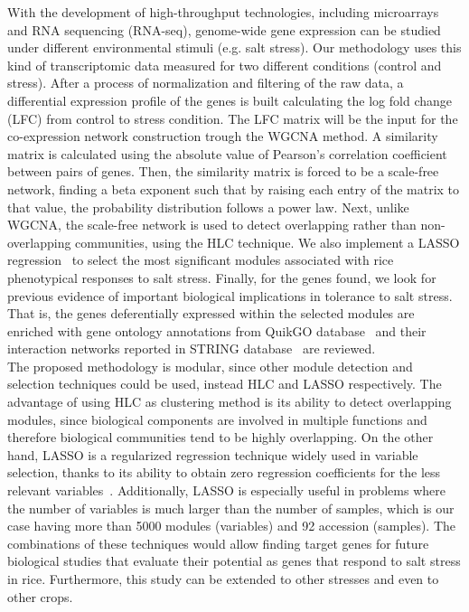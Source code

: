 \documentclass[12pt,journal, onecolumn]{IEEEtran}
\begin{document}
With the development of high-throughput technologies, including microarrays and RNA sequencing (RNA-seq), genome-wide gene expression can be studied under different environmental stimuli (e.g. salt stress). Our methodology uses this kind of transcriptomic data measured for two different conditions (control and stress). After a process of normalization and filtering of the raw data, a differential expression profile of the genes is built calculating the log fold change (LFC) from control to stress condition. The LFC matrix will be the input for the co-expression network construction trough the WGCNA method. A similarity matrix is calculated using the absolute value of Pearson's correlation coefficient between pairs of genes. Then, the similarity matrix is forced to be a scale-free network, finding a beta exponent such that by raising each entry of the matrix to that value, the probability distribution follows a power law. Next, unlike WGCNA, the scale-free network is used to detect overlapping rather than non-overlapping communities, using the HLC technique. We also implement a LASSO regression~\cite{tibshirani1996regression} to select the most significant modules associated with rice phenotypical responses to salt stress. Finally, for the genes found, we look for previous evidence of important biological implications in tolerance to salt stress. That is, the genes deferentially expressed within the selected modules are enriched with gene ontology annotations from QuikGO database~\cite{binns2009quickgo} and their interaction networks reported in STRING database~\cite{szklarczyk2016string} are reviewed.\\

The proposed methodology is modular, since other module detection and selection techniques could be used, instead HLC and LASSO respectively. The advantage of using HLC as clustering method is its ability to detect overlapping modules, since biological components are involved in multiple functions and therefore biological communities tend to be highly overlapping. On the other hand, LASSO is a regularized regression technique widely used in variable selection, thanks to its ability to obtain zero regression coefficients for the less relevant variables~\cite{desboulets2018review}. Additionally, LASSO is especially useful in problems where the number of variables is much larger than the number of samples, which is our case having more than 5000 modules (variables) and 92 accession (samples). The combinations of these techniques would allow finding target genes for future biological studies that evaluate their potential as genes that respond to salt stress in rice. Furthermore, this study can be extended to other stresses and even to other crops.\\
\end{document}
